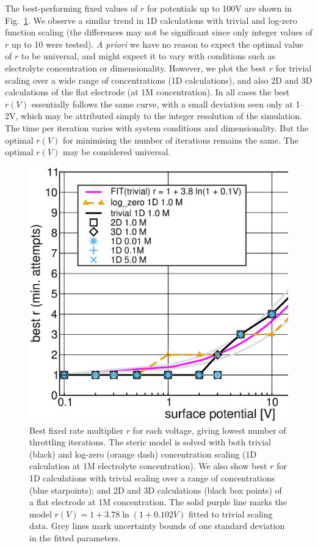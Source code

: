 The best-performing fixed values of $r$  for potentials up to 100V are shown
in  Fig.~\ref{fig:best_throttle_rate}.  We observe a similar trend in 1D calculations with
trivial and log-zero function scaling  (the
differences may not be significant since only integer values of $r$ up
to 10 were tested). \textit{A priori} we have no reason to expect the
optimal value of $r$ to be universal, and might expect it to vary with
conditions such as electrolyte concentration or
dimensionality. However, we plot the best $r$ for trivial
scaling over  a wide range of concentrations (1D calculations), and
also 2D and 3D calculations of the flat electrode (at 1M
concentration). In all cases the best $r(V)$  essentially follows the
same curve, with a small deviation seen only at 1--2V, which may be attributed simply to the
integer resolution of the simulation.  The time per iteration varies with system conditions and
dimensionality. But the optimal $r(V)$ for minimising the number of
iterations remains the same. The optimal $r(V)$ may be considered universal.



\begin{figure}
\centering
\includegraphics[width=0.8\linewidth]{best_r_vs_V.eps}
\caption{Best fixed rate multiplier $r$ for each voltage, giving lowest
  number of throttling iterations. The steric model is solved with both
  trivial (black) and log-zero (orange dash) concentration scaling (1D calculation at 1M
  electrolyte concentration).
  We also show best $r$ for 1D calculations with trivial scaling over a range of
  concentrations (blue starpoints);
  and 2D and 3D calculations (black box points) of a flat electrode at
  1M concentration. The solid purple line marks the model $r(V) = 1 +
  3.78 \ln(1 + 0.102 V)$ fitted to trivial scaling data. Grey lines
  mark uncertainty bounds of one standard deviation in the fitted parameters.
}
\label{fig:best_throttle_rate}
\end{figure}


